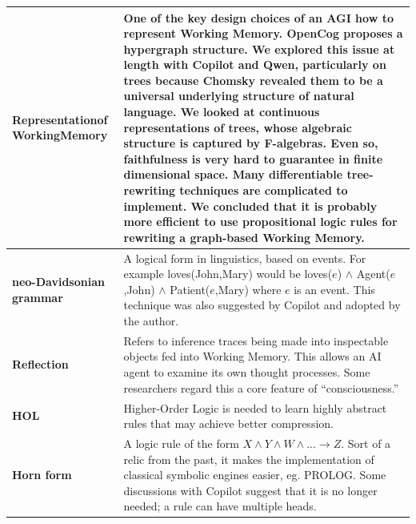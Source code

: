 \documentclass[runningheads]{llncs}
\begin{document}
\begin{longtable}{|p{2.5cm}|p{10cm}|}
	\hline \textbf{Representation\newline of Working\newline Memory} & One of the key design choices of an AGI how to represent Working Memory.  OpenCog proposes a hypergraph structure. We explored this issue at length with Copilot and Qwen, particularly on trees because Chomsky revealed them to be a universal underlying structure of natural language. We looked at continuous representations of trees, whose algebraic structure is captured by \textbf{F-algebras}. Even so, faithfulness is very hard to guarantee in finite dimensional space. Many differentiable tree-rewriting techniques are complicated to implement.  We concluded that it is probably more efficient to use propositional logic rules for rewriting a graph-based Working Memory. \\

	\hline \textbf{neo-Davidsonian grammar} & A logical form in linguistics, based on events. For example loves(John,Mary) would be loves($e$) $\wedge$ Agent($e$,John) $\wedge$ Patient($e$,Mary) where $e$ is an event. This technique was also suggested by Copilot and adopted by the author. \\

	\hline \textbf{Reflection} & Refers to inference traces being made into inspectable objects fed into Working Memory. This allows an AI agent to examine its own thought processes. Some researchers regard this a core feature of ``consciousness.'' \\


	\hline \textbf{HOL} & Higher-Order Logic is needed to learn highly abstract rules that may achieve better compression. \\

	\hline \textbf{Horn form} & A logic rule of the form $X \wedge Y \wedge W \wedge ... \rightarrow Z$.  Sort of a relic from the past, it makes the implementation of classical symbolic engines easier, eg. PROLOG. Some discussions with Copilot suggest that it is no longer needed; a rule can have multiple heads. \\

	\hline
\end{longtable}



\printbibliography
\end{document}
